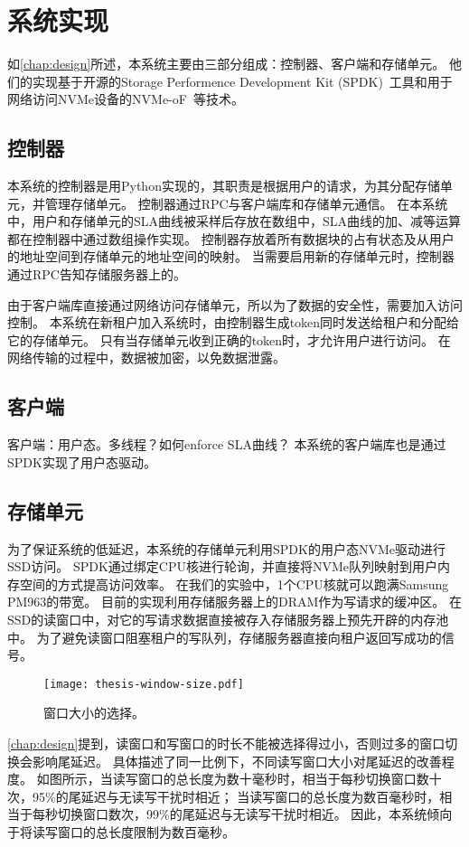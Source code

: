 
\chapter{系统实现}
\label{chap:impl}

如\autoref{chap:design}所述，本系统主要由三部分组成：控制器、客户端和存储单元。
他们的实现基于开源的Storage Performence Development Kit (SPDK)~\cite{yang2017spdk}工具和用于网络访问NVMe设备的NVMe-oF~\cite{nvmeof2016}等技术。

\section{控制器}
\label{sec:impl-controller}

本系统的控制器是用Python实现的，其职责是根据用户的请求，为其分配存储单元，并管理存储单元。
控制器通过RPC与客户端库和存储单元通信。
在本系统中，用户和存储单元的SLA曲线被采样后存放在数组中，SLA曲线的加、减等运算都在控制器中通过数组操作实现。
控制器存放着所有数据块的占有状态及从用户的地址空间到存储单元的地址空间的映射。
当需要启用新的存储单元时，控制器通过RPC告知存储服务器上的。

由于客户端库直接通过网络访问存储单元，所以为了数据的安全性，需要加入访问控制。
本系统在新租户加入系统时，由控制器生成token同时发送给租户和分配给它的存储单元。
只有当存储单元收到正确的token时，才允许用户进行访问。
在网络传输的过程中，数据被加密，以免数据泄露。

\section{客户端}
\label{sec:impl-client}

客户端：用户态。多线程？如何enforce SLA曲线？
本系统的客户端库也是通过SPDK实现了用户态驱动。

\section{存储单元}
\label{sec:impl-storage-unit}

为了保证系统的低延迟，本系统的存储单元利用SPDK的用户态NVMe驱动进行SSD访问。
SPDK通过绑定CPU核进行轮询，并直接将NVMe队列映射到用户内存空间的方式提高访问效率。
在我们的实验中，1个CPU核就可以跑满Samsung PM963的带宽。
目前的实现利用存储服务器上的DRAM作为写请求的缓冲区。
在SSD的读窗口中，对它的写请求数据直接被存入存储服务器上预先开辟的内存池中。
为了避免读窗口阻塞租户的写队列，存储服务器直接向租户返回写成功的信号。


\begin{figure}[h]
  \centering
  \texttt{[image: thesis-window-size.pdf]}
  \caption{
        窗口大小的选择。
      }
  \label{fig:impl-window-size}
\end{figure}

\autoref{chap:design}提到，读窗口和写窗口的时长不能被选择得过小，否则过多的窗口切换会影响尾延迟。
具体描述了同一比例下，不同读写窗口大小对尾延迟的改善程度。
如图所示，当读写窗口的总长度为数十毫秒时，相当于每秒切换窗口数十次，95\%的尾延迟与无读写干扰时相近；
当读写窗口的总长度为数百毫秒时，相当于每秒切换窗口数次，99\%的尾延迟与无读写干扰时相近。
因此，本系统倾向于将读写窗口的总长度限制为数百毫秒。